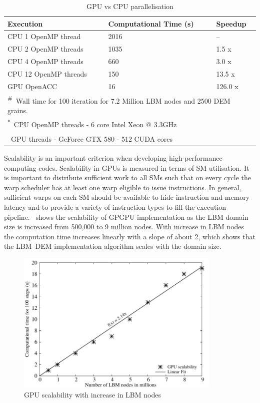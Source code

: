 \begin{table}[tbhp]
	\caption{GPU vs CPU parallelisation}
	\label{table:GPU}
	\centering
	\begin{tabular}{l l l}
		\toprule
		Execution & Computational Time (s) &  Speedup \\
		\midrule
		CPU 1 OpenMP thread		& 2016	 & -- \\
		CPU 2 OpenMP threads	& 1035	 & 1.5 x \\
		CPU 4 OpenMP threads	& 660 	 & 3.0 x \\
		CPU 12 OpenMP threads	& 150	 & 13.5 x\\
		GPU OpenACC				& 16	 & 126.0 x \\
		\bottomrule
		\multicolumn{3}{l}{\footnotesize{\textsuperscript{\#}}~Wall time 
		for 100 iteration for 7.2 Million LBM nodes and 2500 DEM grains.} \\
		\multicolumn{3}{l}{\footnotesize{\textsuperscript{*}~CPU OpenMP threads 
		- 6 core Intel Xeon $\mathrm{@}$ 3.3GHz}} \\
		\multicolumn{3}{l}{\footnotesize{\textsuperscript{\dag}~GPU threads - 
		GeForce GTX 580 - 512 CUDA cores}}
	\end{tabular}
\end{table}

Scalability is an important criterion when developing high-performance 
computing codes. Scalability in GPUs is measured in terms of SM utilisation. It 
is important to distribute sufficient work to all SMs such that on every cycle 
the warp scheduler has at least one warp eligible to issue instructions. In 
general, sufficient warps on each SM should be available to hide instruction 
and memory latency and to provide a variety of instruction types to 
fill the execution pipeline.~ shows the scalability of 
GPGPU implementation as the LBM domain size is increased from 500,000 to 9 
million nodes. With increase in LBM nodes the computation time increases 
linearly with a slope of about 2, which shows that the LBM--DEM implementation 
algorithm scales with the domain size.

\begin{figure}[tbhp]
	\centering
	\includegraphics[width=0.87\textwidth]{GPU_Speedup}
	\caption{GPU scalability with increase in LBM nodes}
	\label{fig:GPUSpeed}
\end{figure}

